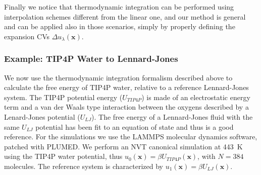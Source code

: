 \documentclass[aps,prx,reprint,superscriptaddress]{revtex4-1} %
\begin{document}
Finally we notice that thermodynamic integration can be performed using interpolation schemes different from the linear one, and our method is general and can be applied also in those scenarios, simply by properly defining the expansion CVs $\Delta u_\lambda(\mathbf{x})$.

\subsubsection*{Example: TIP4P Water to Lennard-Jones}
We now use the thermodynamic integration formalism described above to calculate the free energy of TIP4P water, relative to a reference Lennard-Jones system.
The TIP4P potential energy ($U_{TIP4P}$) is made of an electrostatic energy term and a van der Waals type interaction between the oxygens described by a Lenard-Jones potential ($U_{LJ}$).
The free energy of a Lennard-Jones fluid with the same $U_{LJ}$ potential has been fit to an equation of state and thus is a good reference\cite{Johnson1993}.
For the simulations we use the LAMMPS\cite{lammps} molecular dynamics software, patched with PLUMED.
We perform an NVT canonical simulation at 443~K using the TIP4P water potential, thus $u_0(\mathbf{x})=\beta U_{TIP4P}(\mathbf{x})$, with $N=384$ molecules.
The reference system is characterized by $u_1(\mathbf{x})=\beta U_{LJ}(\mathbf{x})$.
\end{document}
